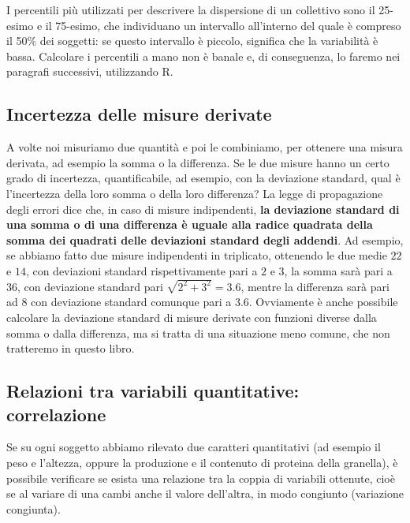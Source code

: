 \documentclass[
  12pt,
]{book}
\begin{document}
I percentili più utilizzati per descrivere la dispersione di un collettivo sono il 25-esimo e il 75-esimo, che individuano un intervallo all'interno del quale è compreso il 50\% dei soggetti: se questo intervallo è piccolo, significa che la variabilità è bassa. Calcolare i percentili a mano non è banale e, di conseguenza, lo faremo nei paragrafi successivi, utilizzando R.

\hypertarget{incertezza-delle-misure-derivate}{%
\subsection{Incertezza delle misure derivate}\label{incertezza-delle-misure-derivate}}

A volte noi misuriamo due quantità e poi le combiniamo, per ottenere una misura derivata, ad esempio la somma o la differenza. Se le due misure hanno un certo grado di incertezza, quantificabile, ad esempio, con la deviazione standard, qual è l'incertezza della loro somma o della loro differenza? La legge di propagazione degli errori dice che, in caso di misure indipendenti, \textbf{la deviazione standard di una somma o di una differenza è uguale alla radice quadrata della somma dei quadrati delle deviazioni standard degli addendi}. Ad esempio, se abbiamo fatto due misure indipendenti in triplicato, ottenendo le due medie \(22\) e \(14\), con deviazioni standard rispettivamente pari a \(2\) e \(3\), la somma sarà pari a \(36\), con deviazione standard pari \(\sqrt{2^2 + 3^2} = 3.6\), mentre la differenza sarà pari ad \(8\) con deviazione standard comunque pari a \(3.6\). Ovviamente è anche possibile calcolare la deviazione standard di misure derivate con funzioni diverse dalla somma o dalla differenza, ma si tratta di una situazione meno comune, che non tratteremo in questo libro.

\hypertarget{relazioni-tra-variabili-quantitative-correlazione}{%
\subsection{Relazioni tra variabili quantitative: correlazione}\label{relazioni-tra-variabili-quantitative-correlazione}}

Se su ogni soggetto abbiamo rilevato due caratteri quantitativi (ad esempio il peso e l'altezza, oppure la produzione e il contenuto di proteina della granella), è possibile verificare se esista una relazione tra la coppia di variabili ottenute, cioè se al variare di una cambi anche il valore dell'altra, in modo congiunto (variazione congiunta).
\end{document}
